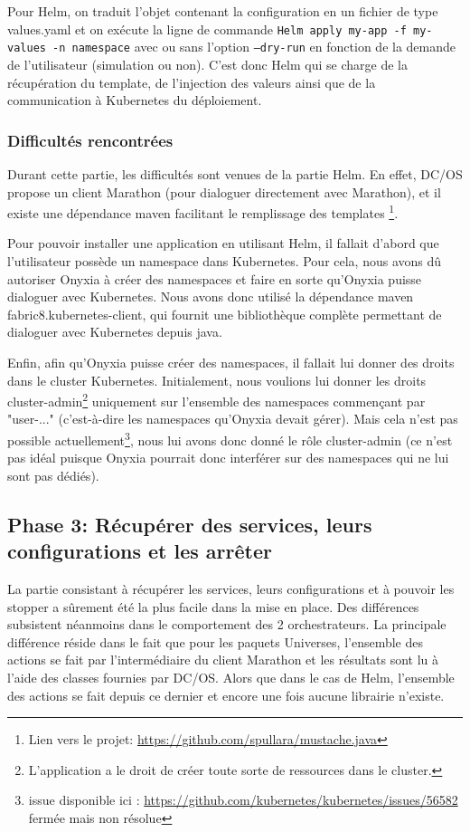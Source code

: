\documentclass[11pt,fleqn]{book} %
\begin{document}
Pour Helm, on traduit l'objet contenant la configuration en un fichier de type values.yaml et on exécute la ligne de commande \texttt{Helm apply my-app -f my-values -n namespace} avec ou sans l'option \texttt{--dry-run} en fonction de la demande de l'utilisateur (simulation ou non). C'est donc Helm qui se charge de la récupération du template, de l'injection des valeurs ainsi que de la communication à Kubernetes du déploiement.

\subsubsection{Difficultés rencontrées}
Durant cette partie, les difficultés sont venues de la partie Helm. En effet, DC/OS propose un client Marathon (pour dialoguer directement avec Marathon), et il existe une dépendance maven facilitant le remplissage des templates \footnote{Lien vers le projet: \url{https://github.com/spullara/mustache.java}}.\newline

Pour pouvoir installer une application en utilisant Helm, il fallait d'abord que l'utilisateur possède un namespace dans Kubernetes. Pour cela, nous avons dû autoriser Onyxia à créer des namespaces et faire en sorte qu'Onyxia puisse dialoguer avec Kubernetes. Nous avons donc utilisé la dépendance maven fabric8.kubernetes-client, qui fournit une bibliothèque complète permettant de dialoguer avec Kubernetes depuis java. \newline

Enfin, afin qu'Onyxia puisse créer des namespaces, il fallait lui donner des droits dans le cluster Kubernetes. Initialement, nous voulions lui donner les droits cluster-admin\footnote{L'application a le droit de créer toute sorte de ressources dans le cluster.} uniquement sur l'ensemble des namespaces commençant par "user-..." (c'est-à-dire les namespaces qu'Onyxia devait gérer). Mais cela n'est pas possible actuellement\footnote{issue disponible ici : \url{https://github.com/kubernetes/kubernetes/issues/56582} fermée mais non résolue}, nous lui avons donc donné le rôle cluster-admin (ce n'est pas idéal puisque Onyxia pourrait donc interférer sur des namespaces qui ne lui sont pas dédiés).

\subsection{Phase 3: Récupérer des services, leurs configurations et les arrêter}
La partie consistant à récupérer les services, leurs configurations et à pouvoir les stopper a sûrement été la plus facile dans la mise en place. Des différences subsistent néanmoins dans le comportement des 2 orchestrateurs. La principale différence réside dans le fait que pour les paquets Universes, l'ensemble des actions se fait par l'intermédiaire du client Marathon  et les résultats sont lu à l'aide des classes fournies par DC/OS. Alors que dans le cas de Helm, l'ensemble des actions se fait depuis ce dernier et encore une fois aucune librairie n'existe.\\
\end{document}
